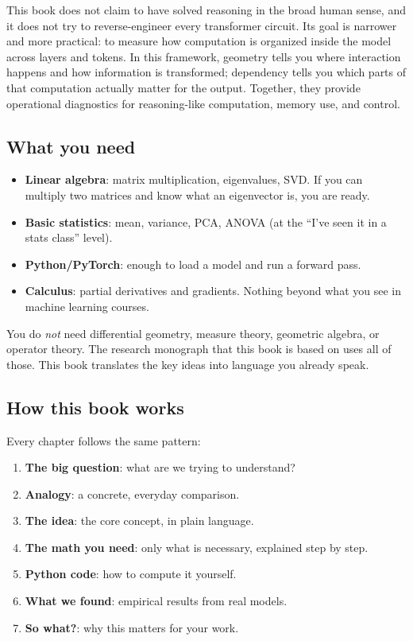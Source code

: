\documentclass[11pt, twoside, openright]{memoir}
\begin{document}
This book does not claim to have solved reasoning in the broad human sense,
and it does not try to reverse-engineer every transformer circuit. Its goal
is narrower and more practical: to measure how computation is organized
inside the model across layers and tokens. In this framework, geometry tells
you where interaction happens and how information is transformed; dependency
tells you which parts of that computation actually matter for the output.
Together, they provide operational diagnostics for reasoning-like
computation, memory use, and control.

\subsection*{What you need}

\begin{itemize}[nosep]
\item \textbf{Linear algebra}: matrix multiplication, eigenvalues, SVD.
  If you can multiply two matrices and know what an eigenvector is,
  you are ready.
\item \textbf{Basic statistics}: mean, variance, PCA, ANOVA
  (at the ``I've seen it in a stats class'' level).
\item \textbf{Python/PyTorch}: enough to load a model and run a forward pass.
\item \textbf{Calculus}: partial derivatives and gradients.
  Nothing beyond what you see in machine learning courses.
\end{itemize}

You do \emph{not} need differential geometry, measure theory, geometric
algebra, or operator theory. The research monograph that this book is based on
uses all of those. This book translates the key ideas into language you already
speak.

\subsection*{How this book works}

Every chapter follows the same pattern:
\begin{enumerate}[nosep]
\item \textbf{The big question}: what are we trying to understand?
\item \textbf{Analogy}: a concrete, everyday comparison.
\item \textbf{The idea}: the core concept, in plain language.
\item \textbf{The math you need}: only what is necessary, explained step by step.
\item \textbf{Python code}: how to compute it yourself.
\item \textbf{What we found}: empirical results from real models.
\item \textbf{So what?}: why this matters for your work.
\end{enumerate}
\end{document}
